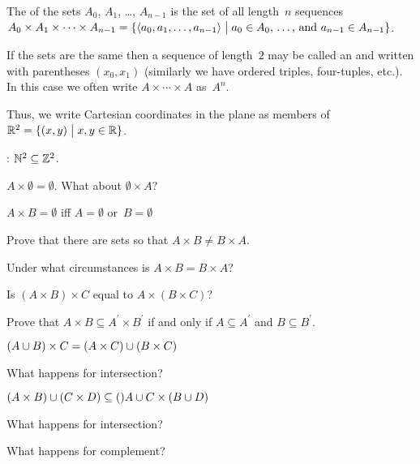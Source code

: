 \documentclass{ibl}
\begin{document}
\begin{df}
The  of the sets $A_0$, $A_1$, \ldots, $A_{n-1}$ 
is the set of all length~$n$ sequences
$A_0\times A_1\times \cdots \times A_{n-1}
  =\{\langle a_0,a_1,\ldots,a_{n-1}\rangle \bigm| \text{$a_0\in A_0$, \ldots, and~$a_{n-1}\in A_{n-1}$}\}$.

If the sets are the same then 
a sequence of length~$2$ may be called an  and 
written with parentheses $(x_0,x_1)$
(similarly we have ordered triples, four-tuples, etc.).
In this case we often write $A\times\cdots\times A$ 
as~$A^n$.
\end{df}

Thus, we write 
Cartesian coordinates in the plane as members of
$\mathbb{R}^2=\{(x,y) \bigm| x,y\in\mathbb{R}\}$.

\begin{ex}
\pord:  $\mathbb{N}^2\subseteq \mathbb{Z}^2$.  
\end{ex}

\begin{ex}
\begin{exes}
\item $A\times \emptyset=\emptyset$.
  What about $\emptyset\times A$?
\item $A\times B=\emptyset$ iff $A=\emptyset$ or~$B=\emptyset$
\item Prove that there are sets so that $A\times B\neq B\times A$.
\item Under what circumstances is $A\times B=B\times A$?
\item Is $(A\times B)\times C$ equal to $A\times (B\times C)$?
\item Prove that $A\times B\subseteq A^\prime\times B^\prime$ if and only if
  $A\subseteq A^\prime$ and $B\subseteq B^\prime$.
\end{exes}
\end{ex}

\begin{ex} 
\begin{exes}
\item $(A\cup B)\times C=(A\times C)\cup(B\times C)$
\item What happens for intersection?
\item $(A\times B)\cup (C\times D)\subseteq ()A\cup C\times (B\cup D)$
\item What happens for intersection?
\item What happens for complement?
\end{exes}
\end{ex}
\end{document}
